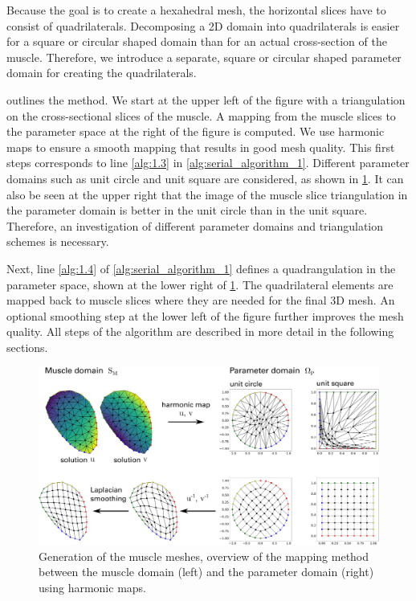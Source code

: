 Because the goal is to create a hexahedral mesh, the horizontal slices have to consist of quadrilaterals. 
Decomposing a 2D domain into quadrilaterals is easier for a square or circular shaped domain than for an actual cross-section of the muscle. Therefore, we introduce a separate, square or circular shaped parameter domain for creating the quadrilaterals.

 outlines the method.
We start at the upper left of the figure with a triangulation on the cross-sectional slices of the muscle. A mapping from the muscle slices to the parameter space at the right of the figure is computed. We use harmonic maps to ensure a smooth mapping that results in good mesh quality. This first steps corresponds to line \ref{alg:1.3} in \cref{alg:serial_algorithm_1}. Different parameter domains such as unit circle and unit square are considered, as shown in \cref{fig:harmonic_map_solution}. It can also be seen at the upper right that the image of the muscle slice triangulation in the parameter domain is better in the unit circle than in the unit square. Therefore, an investigation of different parameter domains and triangulation schemes is necessary.

Next, line \ref{alg:1.4} of \cref{alg:serial_algorithm_1} defines a quadrangulation in the parameter space, shown at the lower right of \cref{fig:harmonic_map_solution}. The quadrilateral elements are mapped back to muscle slices where they are needed for the final 3D mesh. An optional smoothing step at the lower left of the figure further improves the mesh quality.
All steps of the algorithm are described in more detail in the following sections.

\begin{figure}%
  \centering%
  \includegraphics[width=\textwidth]{images/fiber_creation/harmonic_map_scheme_circle_square.pdf}%
  \caption{Generation of the muscle meshes, overview of the mapping method between the muscle domain (left) and the parameter domain (right) using harmonic maps.}%
  \label{fig:harmonic_map_solution}%
\end{figure}%

